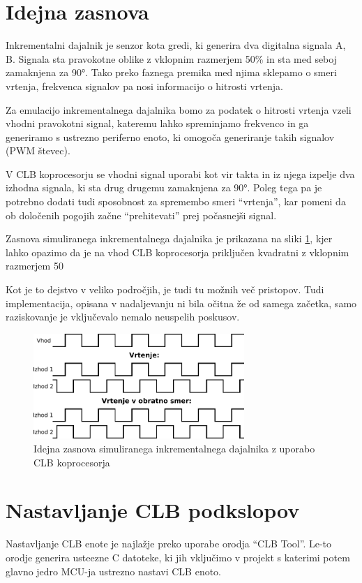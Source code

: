 \documentclass[a4paper]{article}
\begin{document}
\begin{sloppypar}
\section{Idejna zasnova}
Inkrementalni dajalnik je senzor kota gredi, ki generira dva digitalna signala
A, B.  Signala sta pravokotne oblike z vklopnim razmerjem 50\% in sta med seboj
zamaknjena za 90°. Tako preko faznega premika med njima sklepamo o smeri
vrtenja, frekvenca signalov pa nosi informacijo o hitrosti vrtenja.

Za emulacijo inkrementalnega dajalnika bomo za podatek o hitrosti vrtenja
vzeli vhodni pravokotni signal, kateremu lahko spreminjamo frekvenco in ga
generiramo s ustrezno periferno enoto, ki omogoča generiranje takih signalov
(PWM števec).

V CLB koprocesorju se vhodni signal uporabi kot vir takta in iz njega izpelje
dva izhodna signala, ki sta drug drugemu zamaknjena za 90°. Poleg
tega pa je potrebno dodati tudi sposobnost za spremembo smeri ``vrtenja'', kar
pomeni da ob določenih pogojih začne ``prehitevati'' prej počasnejši signal.

Zasnova simuliranega inkrementalnega dajalnika je prikazana na sliki
\ref{fig:enkoder_zasnova}, kjer lahko opazimo da je na vhod CLB koprocesorja
priključen kvadratni z vklopnim razmerjem 50%

Kot je to dejstvo v veliko področjih, je tudi tu možnih več
pristopov. Tudi implementacija, opisana v nadaljevanju ni bila očitna že od
samega začetka, samo raziskovanje je vključevalo nemalo neuspelih poskusov.

\begin{figure}[htb]
    \centerline{\includegraphics[width=8cm]{enkoder_zasnova}}
    \caption{Idejna zasnova simuliranega inkrementalnega dajalnika z uporabo
             CLB koprocesorja}
    \label{fig:enkoder_zasnova} 
\end{figure} 


\section{Nastavljanje CLB podkslopov}\label{sec:nastavitve_podsklopov}
Nastavljanje CLB enote je najlažje preko uporabe orodja ``CLB Tool''. Le-to
orodje generira usteezne C datoteke, ki jih vključimo v projekt s katerimi
potem glavno jedro MCU-ja ustrezno nastavi CLB enoto. 


\end{sloppypar}
\end{document}
